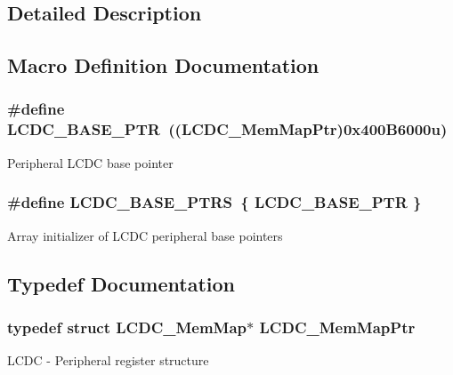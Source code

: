 \subsection{Detailed Description}


\subsection{Macro Definition Documentation}
\hypertarget{group___l_c_d_c___peripheral_ga87dd9b3292c2c039290038a24dda01c4}{}
\subsubsection[{L\+C\+D\+C\+\_\+\+B\+A\+S\+E\+\_\+\+P\+T\+R}]{\setlength{\rightskip}{0pt plus 5cm}\#define L\+C\+D\+C\+\_\+\+B\+A\+S\+E\+\_\+\+P\+T\+R~(({\bf L\+C\+D\+C\+\_\+\+Mem\+Map\+Ptr})0x400\+B6000u)}\label{group___l_c_d_c___peripheral_ga87dd9b3292c2c039290038a24dda01c4}
Peripheral L\+C\+D\+C base pointer \hypertarget{group___l_c_d_c___peripheral_ga82f1fb1d895768e620108f8fd5ab276a}{}
\subsubsection[{L\+C\+D\+C\+\_\+\+B\+A\+S\+E\+\_\+\+P\+T\+R\+S}]{\setlength{\rightskip}{0pt plus 5cm}\#define L\+C\+D\+C\+\_\+\+B\+A\+S\+E\+\_\+\+P\+T\+R\+S~\{ {\bf L\+C\+D\+C\+\_\+\+B\+A\+S\+E\+\_\+\+P\+T\+R} \}}\label{group___l_c_d_c___peripheral_ga82f1fb1d895768e620108f8fd5ab276a}
Array initializer of L\+C\+D\+C peripheral base pointers 

\subsection{Typedef Documentation}
\hypertarget{group___l_c_d_c___peripheral_ga1c8cfa0904993c6824ce5630db14b104}{}
\subsubsection[{L\+C\+D\+C\+\_\+\+Mem\+Map\+Ptr}]{\setlength{\rightskip}{0pt plus 5cm}typedef struct {\bf L\+C\+D\+C\+\_\+\+Mem\+Map}$\ast$ {\bf L\+C\+D\+C\+\_\+\+Mem\+Map\+Ptr}}\label{group___l_c_d_c___peripheral_ga1c8cfa0904993c6824ce5630db14b104}
L\+C\+D\+C -\/ Peripheral register structure 
